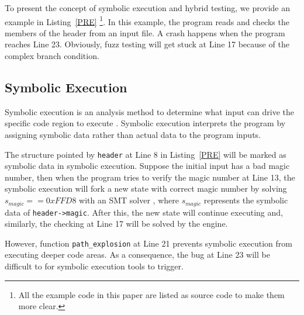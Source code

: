 To present the concept of symbolic execution and hybrid testing, we provide an example in Listing~\ref{PRE} \footnote{All the example code in this paper are listed as source code to make them more clear.}.
 In this example, the program reads and checks the members of the header from an input file. A crash happens when the program reaches Line 23. 
 Obviously, fuzz testing will get stuck at Line 17 because of the complex branch condition.

\subsection{Symbolic Execution}
Symbolic execution is an analysis method to determine what input can drive the specific code region to execute \cite{King:Symbex}. Symbolic execution interprets the program by assigning symbolic data rather than actual data to the program inputs. 

 

The structure pointed by \texttt{header} at Line 8 in Listing~\ref{PRE} will be marked as symbolic data in symbolic execution.
 Suppose the initial input has a bad magic number, 
 then when the program tries to verify the magic number at Line 13, 
 the symbolic execution will fork a new state with correct magic number by solving $s_{magic} == 0xFFD8$ with an SMT solver \cite{brummayer2009boolector, de2008z3}, where $s_{magic}$ represents the symbolic data of \texttt{header->magic}. 
 After this, the new state will continue executing and, similarly, the checking at Line 17 will be solved by the engine. 
 
 However, function \texttt{path\_explosion} at Line 21 prevents symbolic execution from executing deeper code areas. 
 As a consequence, the bug at Line 23 will be difficult to for symbolic execution tools to trigger.

